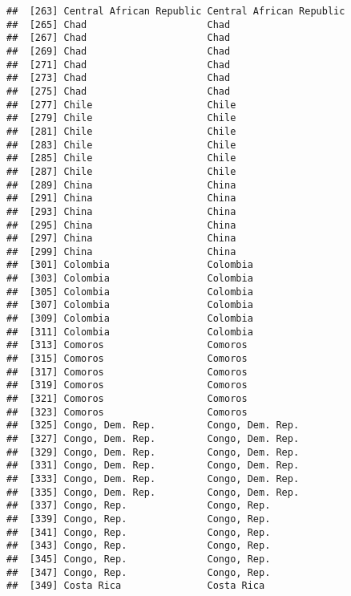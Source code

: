\documentclass[]{article}
\begin{document}
\begin{verbatim}
##  [263] Central African Republic Central African Republic
##  [265] Chad                     Chad                    
##  [267] Chad                     Chad                    
##  [269] Chad                     Chad                    
##  [271] Chad                     Chad                    
##  [273] Chad                     Chad                    
##  [275] Chad                     Chad                    
##  [277] Chile                    Chile                   
##  [279] Chile                    Chile                   
##  [281] Chile                    Chile                   
##  [283] Chile                    Chile                   
##  [285] Chile                    Chile                   
##  [287] Chile                    Chile                   
##  [289] China                    China                   
##  [291] China                    China                   
##  [293] China                    China                   
##  [295] China                    China                   
##  [297] China                    China                   
##  [299] China                    China                   
##  [301] Colombia                 Colombia                
##  [303] Colombia                 Colombia                
##  [305] Colombia                 Colombia                
##  [307] Colombia                 Colombia                
##  [309] Colombia                 Colombia                
##  [311] Colombia                 Colombia                
##  [313] Comoros                  Comoros                 
##  [315] Comoros                  Comoros                 
##  [317] Comoros                  Comoros                 
##  [319] Comoros                  Comoros                 
##  [321] Comoros                  Comoros                 
##  [323] Comoros                  Comoros                 
##  [325] Congo, Dem. Rep.         Congo, Dem. Rep.        
##  [327] Congo, Dem. Rep.         Congo, Dem. Rep.        
##  [329] Congo, Dem. Rep.         Congo, Dem. Rep.        
##  [331] Congo, Dem. Rep.         Congo, Dem. Rep.        
##  [333] Congo, Dem. Rep.         Congo, Dem. Rep.        
##  [335] Congo, Dem. Rep.         Congo, Dem. Rep.        
##  [337] Congo, Rep.              Congo, Rep.             
##  [339] Congo, Rep.              Congo, Rep.             
##  [341] Congo, Rep.              Congo, Rep.             
##  [343] Congo, Rep.              Congo, Rep.             
##  [345] Congo, Rep.              Congo, Rep.             
##  [347] Congo, Rep.              Congo, Rep.             
##  [349] Costa Rica               Costa Rica              

\end{verbatim}
\end{document}
